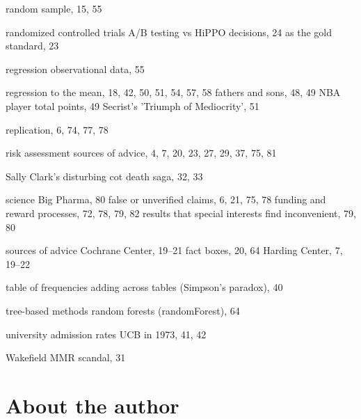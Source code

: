 \documentclass[
  10pt,
  b5paper]{book}
\begin{document}
\begin{theindex}
  \indexspace

  \item random sample, 15, 55
  \item randomized controlled trials
    \subitem A/B testing vs HiPPO decisions, 24
    \subitem as the gold standard, 23
  \item regression
    \subitem observational data, 55
  \item regression to the mean, 18, 42, 50, 51, 54, 57, 58
    \subitem fathers and sons, 48, 49
    \subitem NBA player total points, 49
    \subitem Secrist's 'Triumph of Mediocrity', 51
  \item replication, 6, 74, 77, 78
  \item risk assessment
    \subitem sources of advice, 4, 7, 20, 23, 27, 29, 37, 75, 81

  \indexspace

  \item Sally Clark's disturbing cot death saga, 32, 33
  \item science
    \subitem Big Pharma, 80
    \subitem false or unverified claims, 6, 21, 75, 78
    \subitem funding and reward processes, 72, 78, 79, 82
    \subitem results that special interests find inconvenient, 79, 80
  \item sources of advice
    \subitem Cochrane Center, 19--21
    \subitem fact boxes, 20, 64
    \subitem Harding Center, 7, 19--22

  \indexspace

  \item table of frequencies
    \subitem adding across tables (Simpson's paradox), 40
  \item tree-based methods
    \subitem random forests (randomForest), 64

  \indexspace

  \item university admission rates
    \subitem UCB in 1973, 41, 42

  \indexspace

  \item Wakefield MMR scandal, 31

\end{theindex}

\thispagestyle{empty}

\hypertarget{author}{%
\section*{About the author}\label{author}}
\end{document}
